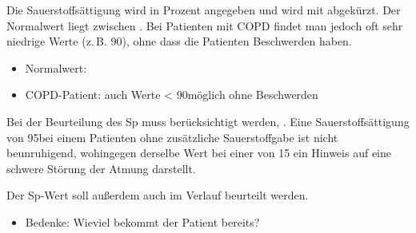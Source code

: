 {%
Die Sauerstoffsättigung wird in Prozent angegeben und wird
mit  abgekürzt. Der Normalwert liegt zwischen
. Bei Patienten mit COPD findet man
jedoch oft sehr niedrige Werte (z.\,B.
90\PC*), ohne dass die Patienten Beschwerden haben.

\bigskip

}{
\begin{itemize}
  \item Normalwert: \PC*
  \item COPD-Patient: auch Werte < 90\PC* möglich ohne
  Beschwerden
\end{itemize}
}{}{}{}


{%
Bei der Beurteilung des Sp muss berücksichtigt
werden, . Eine Sauerstoffsättigung von 95\PC* bei
einem Patienten ohne zusätzliche Sauerstoffgabe ist nicht
beunruhigend, wohingegen derselbe Wert bei einer
 von 15{\LPerMin*} ein Hinweis auf eine
schwere Störung der Atmung darstellt.

Der Sp-Wert soll außerdem auch im
Verlauf beurteilt werden.
\cite{Soehnke200607}

}{
\begin{itemize}
  \item Bedenke: Wieviel  bekommt der Patient
  bereits?
\end{itemize}
}{}{}{}




